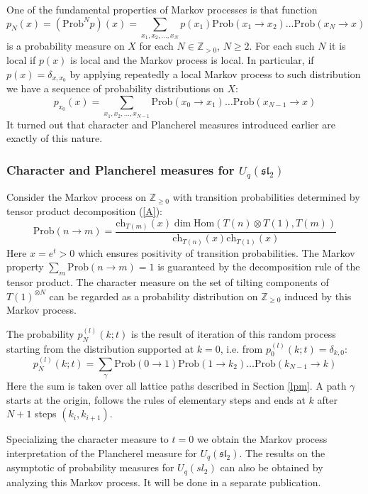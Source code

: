 \documentclass[11pt]{amsart}
\newcommand\lie[1]{\mathfrak{#1}}
\newcommand{\Z}{\mathbb{Z}}
\begin{document}
One of the fundamental properties of Markov processes is that function 
\[
p_N(x)=(\mathrm{Prob}^Np)(x)=\sum_{x_1,x_2,\dots, x_N}p(x_1)\mathrm{Prob}(x_1\to x_2)\dots \mathrm{Prob}(x_N\to x)
\]
is a probability measure on $X$ for each $N\in\mathbb{Z}_{>0}$, $N\geq 2$. For each such $N$ it is local if $p(x)$ is local and the Markov process is local. In particular, if $p(x)=\delta_{x,x_0}$ by applying repeatedly a local Markov process to such distribution we have a sequence of probability distributions on $X$:
\[
p_{x_0}(x)=\sum_{x_1,x_2,\dots, x_{N-1}}\mathrm{Prob}(x_0\to x_1)\dots \mathrm{Prob}(x_{N-1}\to x)
\]
It turned out that character and Plancherel measures introduced earlier are exactly of this nature.



\subsubsection{Character and Plancherel measures for $U_q(\lie{sl}_2)$} 
Consider the Markov process on $\Z_{\geq 0}$ with transition probabilities determined by tensor product decomposition (\ref{A}):
\begin{equation*}
\mathrm{Prob}(n\to m)=\frac{\mathrm{ch}_{T(m)}(x)\dim\mathrm{Hom}(T(n)\otimes T(1),T(m))}{\mathrm{ch}_{T(n)}(x)\mathrm{ch}_{T(1)}(x)}
\end{equation*}
Here $x=e^t>0$ which ensures positivity of transition probabilities. The Markov property $\sum_m \mathrm{Prob}(n\to m)=1$ is guaranteed by the decomposition rule of the tensor product. The character measure on the set of tilting components of $T(1)^{\otimes N}$ can be regarded as a probability distribution on $\Z_{\geq 0}$ induced by this Markov process. 

The probability $p^{(l)}_N(k;t)$ is the result of iteration of this random process starting from the distribution supported at $k=0$, i.e. from $p^{(l)}_0(k;t)=\delta_{k,0}$:
\[
p^{(l)}_N(k;t)=\sum_{\gamma} \mathrm{Prob}(0\to 1)\mathrm{Prob}(1\to k_2)\dots \mathrm{Prob}(k_{N-1}\to k)
\]
Here the sum is taken over all lattice paths described in Section \ref{lpm}. A path $\gamma$ starts at the origin, follows the rules of elementary steps and ends at $k$ after $N+1$ steps $(k_i,k_{i+1})$.

Specializing the character measure to $t=0$ we obtain the Markov process interpretation of the Plancherel measure for $U_q(\lie{sl}_2)$. The results on the asymptotic of probability measures for $U_q(sl_2)$ can also be obtained by analyzing this Markov process. It will be done in a separate publication.
\end{document}
